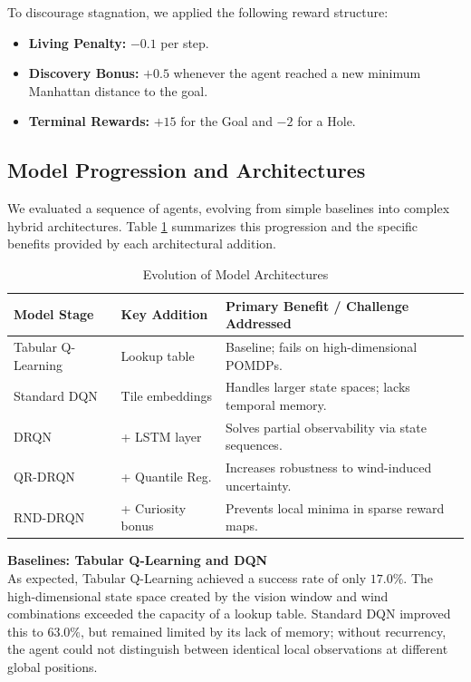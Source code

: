 \documentclass{article}
\begin{document}
To discourage stagnation, we applied the following reward structure:
\begin{itemize}
    \item \textbf{Living Penalty:} $-0.1$ per step.
    \item \textbf{Discovery Bonus:} $+0.5$ whenever the agent reached a new minimum Manhattan distance to the goal.
    \item \textbf{Terminal Rewards:} $+15$ for the Goal and $-2$ for a Hole.
\end{itemize}
\subsection{Model Progression and Architectures}
We evaluated a sequence of agents, evolving from simple baselines into complex hybrid architectures. Table \ref{architecture-table} summarizes this progression and the specific benefits provided by each architectural addition.

\begin{table}[H]
    \centering
    \caption{Evolution of Model Architectures}
    \label{architecture-table}
    \begin{tabularx}{\textwidth}{l l X}
        \toprule
        \textbf{Model Stage} & \textbf{Key Addition} & \textbf{Primary Benefit / Challenge Addressed} \\
        \midrule
        Tabular Q-Learning & Lookup table & Baseline; fails on high-dimensional POMDPs. \\
        Standard DQN & Tile embeddings & Handles larger state spaces; lacks temporal memory. \\
        DRQN & + LSTM layer & Solves partial observability via state sequences. \\
        QR-DRQN & + Quantile Reg. & Increases robustness to wind-induced uncertainty. \\
        RND-DRQN & + Curiosity bonus & Prevents local minima in sparse reward maps. \\
        \bottomrule
    \end{tabularx}
\end{table}

\textbf{Baselines: Tabular Q-Learning and DQN} \\
As expected, Tabular Q-Learning achieved a success rate of only $17.0\%$. The high-dimensional state space created by the vision window and wind combinations exceeded the capacity of a lookup table. Standard DQN improved this to $63.0\%$, but remained limited by its lack of memory; without recurrency, the agent could not distinguish between identical local observations at different global positions.
\end{document}
